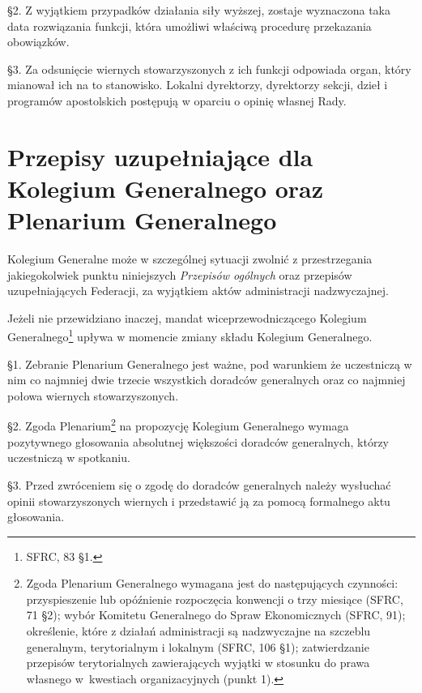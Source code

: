 \S{}2. Z wyjątkiem przypadków działania siły wyższej, zostaje wyznaczona taka data rozwiązania funkcji, która umożliwi właściwą procedurę przekazania obowiązków.

\S{}3. Za odsunięcie wiernych stowarzyszonych z ich funkcji odpowiada organ, który mianował ich na to stanowisko. Lokalni dyrektorzy, dyrektorzy sekcji, dzieł i programów apostolskich postępują w oparciu o opinię własnej Rady.

%
\chapter{Przepisy uzupełniające dla Kolegium Generalnego oraz Plenarium Generalnego}


 Kolegium Generalne może w szczególnej sytuacji zwolnić z przestrzegania jakiegokolwiek punktu niniejszych {\em Przepisów ogólnych} oraz przepisów uzupełniających Federacji, za wyjątkiem aktów administracji nadzwyczajnej.


 Jeżeli nie przewidziano inaczej, mandat wiceprzewodniczącego Kolegium Generalnego\footnote{SFRC, 83 \S{}1.} upływa w momencie zmiany składu Kolegium Generalnego.


\S{}1. Zebranie Plenarium Generalnego jest ważne, pod warunkiem że uczestniczą w nim co najmniej dwie trzecie wszystkich doradców generalnych oraz co najmniej połowa wiernych stowarzyszonych.

\S{}2. Zgoda Plenarium\footnote{Zgoda Plenarium Generalnego wymagana jest do następujących czynności: przyspieszenie lub opóźnienie rozpoczęcia konwencji o trzy miesiące (SFRC, 71 \S{}2); wybór Komitetu Generalnego do Spraw Ekonomicznych (SFRC, 91); określenie, które z działań administracji są nadzwyczajne na szczeblu generalnym, terytorialnym i lokalnym (SFRC, 106 \S{}1); zatwierdzanie przepisów terytorialnych zawierających wyjątki w stosunku do prawa własnego \mbox{w kwestiach} organizacyjnych (punkt 1).} na propozycję Kolegium Generalnego wymaga pozytywnego głosowania absolutnej większości doradców generalnych, którzy uczestniczą w spotkaniu.

\S{}3. Przed zwróceniem się o zgodę do doradców generalnych należy wysłuchać opinii stowarzyszonych wiernych i przedstawić ją za pomocą formalnego aktu głosowania.


